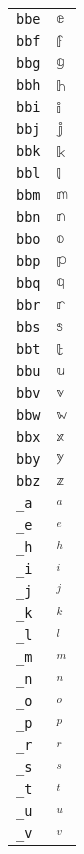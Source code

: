 \begin{longtable}{ll}
\texttt{bbe}&${}{\mathbb{e}}{}$\\
\texttt{bbf}&${}{\mathbb{f}}{}$\\
\texttt{bbg}&${}{\mathbb{g}}{}$\\
\texttt{bbh}&${}{\mathbb{h}}{}$\\
\texttt{bbi}&${}{\mathbb{i}}{}$\\
\texttt{bbj}&${}{\mathbb{j}}{}$\\
\texttt{bbk}&${}{\mathbb{k}}{}$\\
\texttt{bbl}&${}{\mathbb{l}}{}$\\
\texttt{bbm}&${}{\mathbb{m}}{}$\\
\texttt{bbn}&${}{\mathbb{n}}{}$\\
\texttt{bbo}&${}{\mathbb{o}}{}$\\
\texttt{bbp}&${}{\mathbb{p}}{}$\\
\texttt{bbq}&${}{\mathbb{q}}{}$\\
\texttt{bbr}&${}{\mathbb{r}}{}$\\
\texttt{bbs}&${}{\mathbb{s}}{}$\\
\texttt{bbt}&${}{\mathbb{t}}{}$\\
\texttt{bbu}&${}{\mathbb{u}}{}$\\
\texttt{bbv}&${}{\mathbb{v}}{}$\\
\texttt{bbw}&${}{\mathbb{w}}{}$\\
\texttt{bbx}&${}{\mathbb{x}}{}$\\
\texttt{bby}&${}{\mathbb{y}}{}$\\
\texttt{bbz}&${}{\mathbb{z}}{}$\\
\texttt{\_a}&${}_a{}$\\
\texttt{\_e}&${}_e{}$\\
\texttt{\_h}&${}_h{}$\\
\texttt{\_i}&${}_i{}$\\
\texttt{\_j}&${}_j{}$\\
\texttt{\_k}&${}_k{}$\\
\texttt{\_l}&${}_l{}$\\
\texttt{\_m}&${}_m{}$\\
\texttt{\_n}&${}_n{}$\\
\texttt{\_o}&${}_o{}$\\
\texttt{\_p}&${}_p{}$\\
\texttt{\_r}&${}_r{}$\\
\texttt{\_s}&${}_s{}$\\
\texttt{\_t}&${}_t{}$\\
\texttt{\_u}&${}_u{}$\\
\texttt{\_v}&${}_v{}$\\

\end{longtable}
